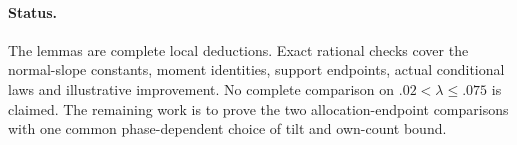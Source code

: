 \documentclass[11pt]{article}
\begin{document}
\paragraph{Status.}
The lemmas are complete local deductions. Exact rational checks cover
the normal-slope constants, moment identities, support endpoints,
actual conditional laws and illustrative improvement. No complete
comparison on $.02<\lambda\le.075$ is claimed. The remaining work is
to prove the two allocation-endpoint comparisons with one common
phase-dependent choice of tilt and own-count bound.
\end{document}
